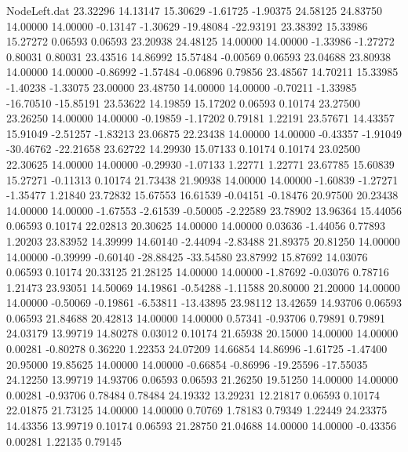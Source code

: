 \begin{filecontents}{NodeLeft.dat}
  23.32296   14.13147   15.30629    -1.61725   -1.90375   24.58125   24.83750   14.00000   14.00000   -0.13147   -1.30629  -19.48084  -22.93191
  23.38392   15.33986   15.27272     0.06593    0.06593   23.20938   24.48125   14.00000   14.00000   -1.33986   -1.27272    0.80031    0.80031
  23.43516   14.86992   15.57484    -0.00569    0.06593   23.04688   23.80938   14.00000   14.00000   -0.86992   -1.57484   -0.06896    0.79856
  23.48567   14.70211   15.33985    -1.40238   -1.33075   23.00000   23.48750   14.00000   14.00000   -0.70211   -1.33985  -16.70510  -15.85191
  23.53622   14.19859   15.17202     0.06593    0.10174   23.27500   23.26250   14.00000   14.00000   -0.19859   -1.17202    0.79181    1.22191
  23.57671   14.43357   15.91049    -2.51257   -1.83213   23.06875   22.23438   14.00000   14.00000   -0.43357   -1.91049  -30.46762  -22.21658
  23.62722   14.29930   15.07133     0.10174    0.10174   23.02500   22.30625   14.00000   14.00000   -0.29930   -1.07133    1.22771    1.22771
  23.67785   15.60839   15.27271    -0.11313    0.10174   21.73438   21.90938   14.00000   14.00000   -1.60839   -1.27271   -1.35477    1.21840
  23.72832   15.67553   16.61539    -0.04151   -0.18476   20.97500   20.23438   14.00000   14.00000   -1.67553   -2.61539   -0.50005   -2.22589
  23.78902   13.96364   15.44056     0.06593    0.10174   22.02813   20.30625   14.00000   14.00000    0.03636   -1.44056    0.77893    1.20203
  23.83952   14.39999   14.60140    -2.44094   -2.83488   21.89375   20.81250   14.00000   14.00000   -0.39999   -0.60140  -28.88425  -33.54580
  23.87992   15.87692   14.03076     0.06593    0.10174   20.33125   21.28125   14.00000   14.00000   -1.87692   -0.03076    0.78716    1.21473
  23.93051   14.50069   14.19861    -0.54288   -1.11588   20.80000   21.20000   14.00000   14.00000   -0.50069   -0.19861   -6.53811  -13.43895
  23.98112   13.42659   14.93706     0.06593    0.06593   21.84688   20.42813   14.00000   14.00000    0.57341   -0.93706    0.79891    0.79891
  24.03179   13.99719   14.80278     0.03012    0.10174   21.65938   20.15000   14.00000   14.00000    0.00281   -0.80278    0.36220    1.22353
  24.07209   14.66854   14.86996    -1.61725   -1.47400   20.95000   19.85625   14.00000   14.00000   -0.66854   -0.86996  -19.25596  -17.55035
  24.12250   13.99719   14.93706     0.06593    0.06593   21.26250   19.51250   14.00000   14.00000    0.00281   -0.93706    0.78484    0.78484
  24.19332   13.29231   12.21817     0.06593    0.10174   22.01875   21.73125   14.00000   14.00000    0.70769    1.78183    0.79349    1.22449
  24.23375   14.43356   13.99719     0.10174    0.06593   21.28750   21.04688   14.00000   14.00000   -0.43356    0.00281    1.22135    0.79145

\end{filecontents}
